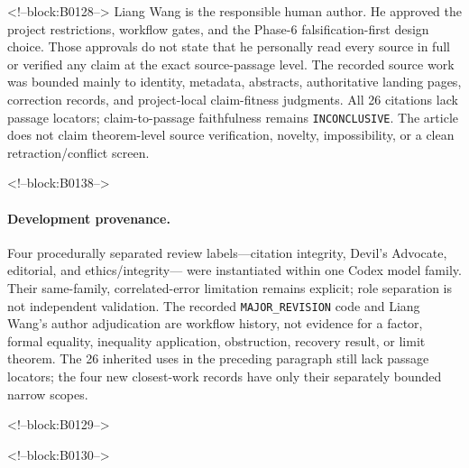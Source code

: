 \documentclass[11pt]{article}
\begin{document}
<!--block:B0128-->
Liang Wang is the responsible human author. He approved the project
restrictions, workflow gates, and the Phase-6 falsification-first design
choice. Those approvals do not state that he personally read every
source in full or verified any claim at the exact source-passage level.
The recorded source work was bounded mainly to identity, metadata,
abstracts, authoritative landing pages, correction records, and
project-local claim-fitness judgments. All 26 citations lack passage
locators; claim-to-passage faithfulness remains \texttt{INCONCLUSIVE}.
The article does not claim theorem-level source verification, novelty,
impossibility, or a clean retraction/conflict screen.

<!--block:B0138-->
\begingroup\sloppy
\paragraph{Development provenance.}  Four procedurally separated review
labels---citation integrity, Devil's Advocate, editorial, and ethics/integrity---
were instantiated within one Codex model family.  Their same-family,
correlated-error limitation remains explicit; role separation is not independent
validation.  The recorded \texttt{MAJOR\_REVISION} code and Liang Wang's author
adjudication are workflow history, not evidence for a factor, formal equality,
inequality application, obstruction, recovery result, or limit theorem.  The 26
inherited uses in the preceding paragraph still lack passage locators; the four
new closest-work records have only their separately bounded narrow scopes.
\par\endgroup

<!--block:B0129-->



<!--block:B0130-->
\end{document}
